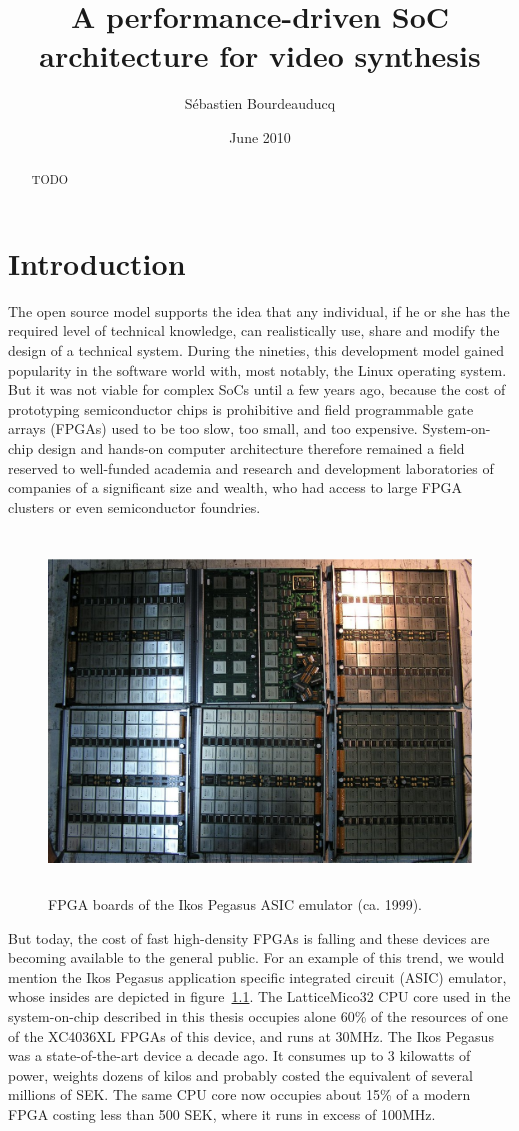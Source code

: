 \documentclass[a4paper,11pt]{kthesis}
\title{A performance-driven SoC architecture for video synthesis}
\date{June 2010}
\author{S\'ebastien Bourdeauducq}
\begin{document}
\begin{abstract}
TODO
\end{abstract}

\tableofcontents
\listoffigures

\mainmatter

\chapter{Introduction}
The open source model supports the idea that any individual, if he or she has the required level of technical knowledge, can realistically use, share and modify the design of a technical system. During the nineties, this development model gained popularity in the software world with, most notably, the Linux operating system. But it was not viable for complex SoCs until a few years ago, because the cost of prototyping semiconductor chips is prohibitive and field programmable gate arrays (FPGAs) used to be too slow, too small, and too expensive. System-on-chip design and hands-on computer architecture therefore remained a field reserved to well-funded academia and research and development laboratories of companies of a significant size and wealth, who had access to large FPGA clusters or even semiconductor foundries.

\begin{figure}[htp]
\centering
\includegraphics[height=95mm]{ikosboards.eps}
\caption{FPGA boards of the Ikos Pegasus ASIC emulator (ca. 1999).}
\label{fig:ikos}
\end{figure}

But today, the cost of fast high-density FPGAs is falling and these devices are becoming available to the general public. For an example of this trend, we would mention the Ikos Pegasus application specific integrated circuit (ASIC) emulator, whose insides are depicted in figure~\ref{fig:ikos}. The LatticeMico32 CPU core used in the system-on-chip described in this thesis occupies alone 60\% of the resources of one of the XC4036XL FPGAs of this device, and runs at 30MHz. The Ikos Pegasus was a state-of-the-art device a decade ago. It consumes up to 3 kilowatts of power, weights dozens of kilos and probably costed the equivalent of several millions of SEK. The same CPU core now occupies about 15\% of a modern FPGA costing less than 500 SEK, where it runs in excess of 100MHz.
\end{document}
